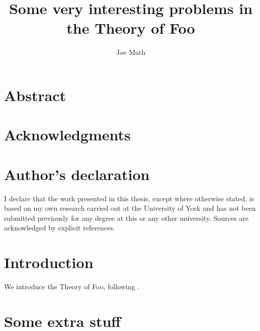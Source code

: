 \documentclass[draft]{yorkthesis}
\title{Some very interesting problems in the Theory of Foo}
\author{Joe Math}
\begin{document}
\frontmatter*

\makethesistitle

\chapter{Abstract}

\blindtext

\clearpage
\tableofcontents




\chapter{Acknowledgments}

\blindtext

\chapter{Author's declaration}

I declare that the work presented in this thesis, except where otherwise stated,
is based on my own research carried out at the University of York and has not
been submitted previously for any degree at this or any other university.
Sources are acknowledged by explicit references.


\mainmatter*

\chapter{Introduction}%
\label{cha:introduction}

We introduce the Theory of Foo, following \cite{Lang2002}.

\blindmathpaper
\blinddocument


\appendix

\chapter{Some extra stuff}
\end{document}
